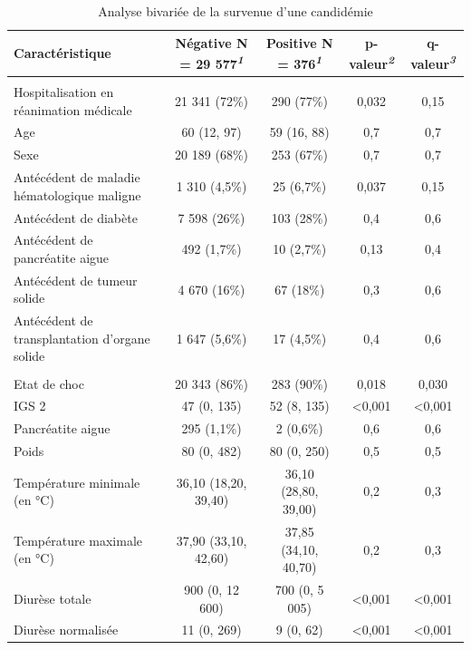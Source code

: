 \documentclass[
  french,
  letterpaper,
  DIV=11,
  numbers=noendperiod,
  justified]{scrartcl}
\begin{document}
\begin{table}
\caption{Analyse bivariée de la survenue d'une candidémie}\tabularnewline

\fontsize{12.0pt}{14.0pt}\selectfont
\begin{tabular*}{\linewidth}{@{\extracolsep{\fill}}lcccc}
\toprule
\textbf{Caractéristique} & \textbf{Négative}  N = 29 577\textsuperscript{\textit{1}} & \textbf{Positive}  N = 376\textsuperscript{\textit{1}} & \textbf{p-valeur}\textsuperscript{\textit{2}} & \textbf{q-valeur}\textsuperscript{\textit{3}} \\
\midrule\addlinespace[2.5pt]
\multicolumn{5}{l}{{\bfseries Données démographiques}} \\[2.5pt]
\midrule\addlinespace[2.5pt]
Hospitalisation en réanimation médicale & 21 341 (72\%) & 290 (77\%) & 0,032 & 0,15 \\
Age & 60 (12, 97) & 59 (16, 88) & 0,7 & 0,7 \\
Sexe & 20 189 (68\%) & 253 (67\%) & 0,7 & 0,7 \\
Antécédent de maladie hématologique maligne & 1 310 (4,5\%) & 25 (6,7\%) & 0,037 & 0,15 \\
Antécédent de diabète & 7 598 (26\%) & 103 (28\%) & 0,4 & 0,6 \\
Antécédent de pancréatite aigue & 492 (1,7\%) & 10 (2,7\%) & 0,13 & 0,4 \\
Antécédent de tumeur solide & 4 670 (16\%) & 67 (18\%) & 0,3 & 0,6 \\
Antécédent de transplantation d'organe solide & 1 647 (5,6\%) & 17 (4,5\%) & 0,4 & 0,6 \\
\midrule\addlinespace[2.5pt]
\multicolumn{5}{l}{{\bfseries Données à l'admission}} \\[2.5pt]
\midrule\addlinespace[2.5pt]
Etat de choc & 20 343 (86\%) & 283 (90\%) & 0,018 & 0,030 \\
IGS 2 & 47 (0, 135) & 52 (8, 135) & <0,001 & <0,001 \\
Pancréatite aigue & 295 (1,1\%) & 2 (0,6\%) & 0,6 & 0,6 \\
Poids & 80 (0, 482) & 80 (0, 250) & 0,5 & 0,5 \\
Température minimale (en °C) & 36,10 (18,20, 39,40) & 36,10 (28,80, 39,00) & 0,2 & 0,3 \\
Température maximale (en °C) & 37,90 (33,10, 42,60) & 37,85 (34,10, 40,70) & 0,2 & 0,3 \\
Diurèse totale & 900 (0, 12 600) & 700 (0, 5 005) & <0,001 & <0,001 \\
Diurèse normalisée & 11 (0, 269) & 9 (0, 62) & <0,001 & <0,001 \\

\end{tabular*}
\end{table}
\end{document}
